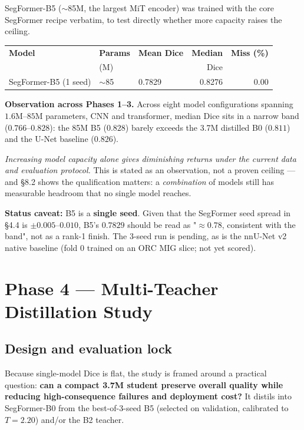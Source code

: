 \documentclass[11pt]{article}
\begin{document}
SegFormer-B5 ($\sim$85M, the largest MiT encoder) was trained with the core SegFormer recipe
verbatim, to test directly whether more capacity raises the ceiling.

\begin{center}\small
\begin{tabular}{L M M n n}
\toprule
\textbf{Model} & \textbf{Params} & \textbf{Mean Dice} & \textbf{Median} & \textbf{Miss (\%)} \\
 & (M) & & Dice & \\
\midrule
SegFormer-B5 (1 seed) & $\sim$85 & 0.7829 & 0.8276 & 0.00 \\
\bottomrule
\end{tabular}
\end{center}

\begin{keybox}
\textbf{Observation across Phases 1--3.} Across eight model configurations spanning $1.6$M--$85$M
parameters, CNN and transformer, median Dice sits in a narrow band ($0.766$--$0.828$): the 85M B5
($0.828$) barely exceeds the 3.7M distilled B0 ($0.811$) and the U-Net baseline ($0.826$).

\emph{Increasing model capacity alone gives diminishing returns under the current data and
evaluation protocol.} This is stated as an observation, not a proven ceiling --- and \S8.2 shows
the qualification matters: a \emph{combination} of models still has measurable headroom that no
single model reaches.
\end{keybox}

\textbf{Status caveat:} B5 is a \textbf{single seed}. Given that the SegFormer seed spread in
\S4.4 is $\pm0.005$--$0.010$, B5's $0.7829$ should be read as "$\approx0.78$, consistent with the
band", not as a rank-1 finish. The 3-seed run is pending, as is the nnU-Net v2 native baseline
(fold 0 trained on an ORC MIG slice; not yet scored).

\section{Phase 4 --- Multi-Teacher Distillation Study}

\subsection{Design and evaluation lock}

Because single-model Dice is flat, the study is framed around a practical question:
\textbf{can a compact 3.7M student preserve overall quality while reducing high-consequence
failures and deployment cost?} It distils into SegFormer-B0 from the best-of-3-seed B5 (selected
on validation, calibrated to $T=2.20$) and/or the B2 teacher.
\end{document}
